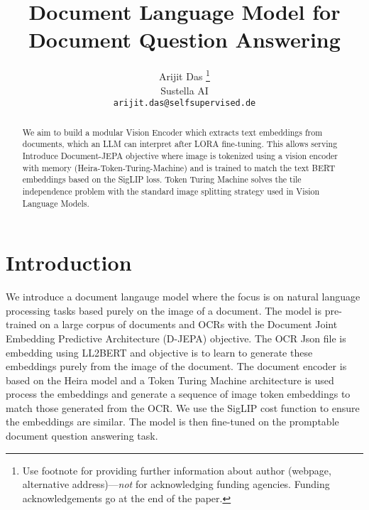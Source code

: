 \documentclass{article} %
\title{Document Language Model for Document Question Answering}
\author{Arijit Das \thanks{Use footnote for providing further information
about author (webpage, alternative address)---\emph{not} for acknowledging
funding agencies. Funding acknowledgements go at the end of the paper.}\\
Sustella AI\\
\texttt{arijit.das@selfsupervised.de}}
\begin{document}
\maketitle

\begin{abstract}
   We aim to build a modular Vision Encoder which extracts text embeddings from documents, which an LLM can interpret after LORA fine-tuning. This allows serving Introduce Document-JEPA objective where image is tokenized using a vision encoder with memory (Heira-Token-Turing-Machine) and is trained to match the text BERT embeddings based on the SigLIP loss. Token Turing Machine solves the tile independence problem with the standard image splitting strategy used in Vision Language Models. 
\end{abstract}

\section{Introduction}

We introduce a document langauge model where the focus is on natural language processing tasks based purely on the image of a document. The model is pre-trained on a large corpus of documents and OCRs with the Document Joint Embedding Predictive Architecture (D-JEPA) objective. The OCR Json file is embedding using LL2BERT and objective is to learn to generate these embeddings purely from the image of the document. The document encoder is based on the Heira model and a Token Turing Machine architecture is used process the embeddings and generate a sequence of image token embeddings to match those generated from the OCR. We use the SigLIP cost function to ensure the embeddings are similar. The model is then fine-tuned on the promptable document question answering task.

\end{document}
